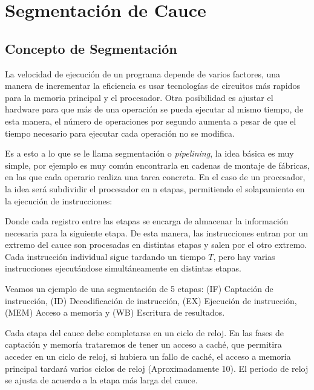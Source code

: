 \chapter{Segmentación de Cauce}
\section{Concepto de Segmentación}
La velocidad de ejecución de un programa depende de varios factores, una manera de incrementar
la eficiencia es usar tecnologías de circuitos más rapidos para la memoria principal y el procesador. Otra posibilidad
es ajustar el hardware para que más de una operación se pueda ejecutar al mismo tiempo, 
de esta manera, el número de operaciones por segundo aumenta a pesar de que el tiempo necesario para ejecutar cada operación no 
se modifica.

Es a esto a lo que se le llama segmentación o \textit{pipelining}, la idea básica es muy simple, por ejemplo es muy 
común encontrarla en cadenas de montaje de fábricas, en las que cada operario realiza una tarea concreta. En el caso de un 
procesador, la idea será subdividir el procesador en n etapas, permitiendo el solapamiento en la ejecución de instrucciones:
\begin{center}
    
\end{center}
Donde cada registro entre las etapas se encarga de almacenar la información necesaria para la siguiente etapa. De esta manera, las instrucciones
entran por un extremo del cauce son procesadas en distintas etapas y salen por el otro extremo. Cada instrucción individual sigue tardando un tiempo 
$T$, pero hay varias instrucciones ejecutándose simultáneamente en distintas etapas.

\begin{ejemplo}
    Veamos un ejemplo de una segmentación de 5 etapas: (IF) Captación de instrucción, (ID) Decodificación de instrucción, (EX) Ejecución de instrucción, (MEM) Acceso a memoria y (WB) Escritura de resultados.
    \begin{center}
        
    \end{center}
    Cada etapa del cauce debe completarse en un ciclo de reloj. En las fases de captación y memoría trataremos de tener un acceso a caché,
    que permitira acceder en un ciclo de reloj, si hubiera un fallo de caché, el acceso a memoria principal tardará varios ciclos de reloj (Aproximadamente 10).
    El periodo de reloj se ajusta de acuerdo a la etapa más larga del cauce.
\end{ejemplo}

